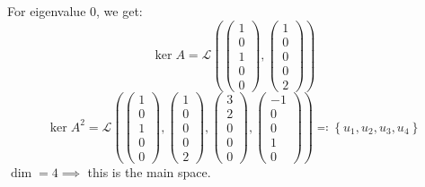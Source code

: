 \documentclass[a4paper]{article}
\theoremstyle{definition}
\newcommand\set[1]{\left\{#1\right\}}
\begin{document}
\begin{enumerate}
    For eigenvalue $0$, we get:
    \[ \ker{A} = \mathcal L\left(\begin{pmatrix} 1 \\ 0 \\ 1 \\ 0 \\ 0 \end{pmatrix}, \begin{pmatrix} 1 \\ 0 \\ 0 \\ 0 \\ 2 \end{pmatrix}\right) \]
    \[ \ker{A^2} = \mathcal L \left(\begin{pmatrix} 1 \\ 0 \\ 1 \\ 0 \\ 0 \end{pmatrix}, \begin{pmatrix} 1 \\ 0 \\ 0 \\ 0 \\ 2 \end{pmatrix}, \begin{pmatrix} 3 \\ 2 \\ 0 \\ 0 \\ 0 \end{pmatrix}, \begin{pmatrix} -1 \\ 0 \\ 0 \\ 1 \\ 0 \end{pmatrix}\right) \eqqcolon \set{u_1, u_2, u_3, u_4} \]
    $\dim = 4 \implies$ this is the main space.


\end{enumerate}
\end{document}
